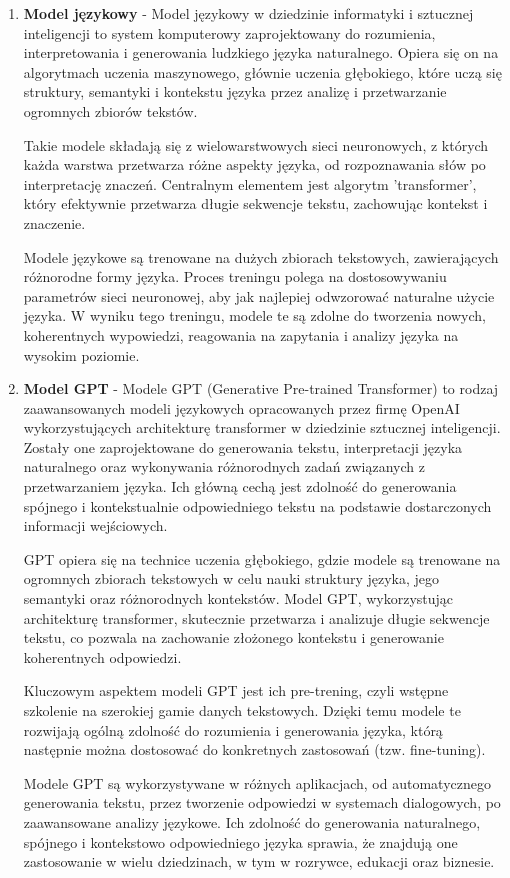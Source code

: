 \begin{enumerate}
    
    \item {\bf Model językowy} - Model językowy w dziedzinie informatyki i sztucznej inteligencji to system komputerowy zaprojektowany do rozumienia, interpretowania i generowania ludzkiego języka naturalnego. Opiera się on na algorytmach uczenia maszynowego, głównie uczenia głębokiego, które uczą się struktury, semantyki i kontekstu języka przez analizę i przetwarzanie ogromnych zbiorów tekstów.

    Takie modele składają się z wielowarstwowych sieci neuronowych, z których każda warstwa przetwarza różne aspekty języka, od rozpoznawania słów po interpretację znaczeń. Centralnym elementem jest algorytm 'transformer', który efektywnie przetwarza długie sekwencje tekstu, zachowując kontekst i znaczenie.
    
    Modele językowe są trenowane na dużych zbiorach tekstowych, zawierających różnorodne formy języka. Proces treningu polega na dostosowywaniu parametrów sieci neuronowej, aby jak najlepiej odwzorować naturalne użycie języka. W wyniku tego treningu, modele te są zdolne do tworzenia nowych, koherentnych wypowiedzi, reagowania na zapytania i analizy języka na wysokim poziomie.
    \\
    \item {\bf Model GPT} - Modele GPT (Generative Pre-trained Transformer) to rodzaj zaawansowanych modeli językowych opracowanych przez firmę OpenAI wykorzystujących architekturę transformer w dziedzinie sztucznej inteligencji. Zostały one zaprojektowane do generowania tekstu, interpretacji języka naturalnego oraz wykonywania różnorodnych zadań związanych z przetwarzaniem języka. Ich główną cechą jest zdolność do generowania spójnego i kontekstualnie odpowiedniego tekstu na podstawie dostarczonych informacji wejściowych.

    GPT opiera się na technice uczenia głębokiego, gdzie modele są trenowane na ogromnych zbiorach tekstowych w celu nauki struktury języka, jego semantyki oraz różnorodnych kontekstów. Model GPT, wykorzystując architekturę transformer, skutecznie przetwarza i analizuje długie sekwencje tekstu, co pozwala na zachowanie złożonego kontekstu i generowanie koherentnych odpowiedzi.
    
    Kluczowym aspektem modeli GPT jest ich pre-trening, czyli wstępne szkolenie na szerokiej gamie danych tekstowych. Dzięki temu modele te rozwijają ogólną zdolność do rozumienia i generowania języka, którą następnie można dostosować do konkretnych zastosowań (tzw. fine-tuning).
    
    Modele GPT są wykorzystywane w różnych aplikacjach, od automatycznego generowania tekstu, przez tworzenie odpowiedzi w systemach dialogowych, po zaawansowane analizy językowe. Ich zdolność do generowania naturalnego, spójnego i kontekstowo odpowiedniego języka sprawia, że znajdują one zastosowanie w wielu dziedzinach, w tym w rozrywce, edukacji oraz biznesie.
    \\
     
 \end{enumerate}

